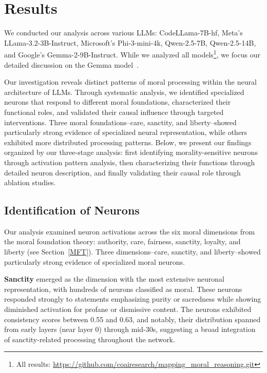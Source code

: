 \documentclass[runninghheads]{llncs}
\begin{document}
\section{Results}
\label{results}


We conducted our analysis across various LLMs: CodeLLama-7B-hf, Meta's LLama-3.2-3B-Instruct, Microsoft's Phi-3-mini-4k, Qwen-2.5-7B, Qwen-2.5-14B, and Google's Gemma-2-9B-Instruct. While we analyzed all models\footnote{All results: \href{https://github.com/coairesearch/mapping_moral_reasoning.git}{https://github.com/coairesearch/mapping\_moral\_reasoning.git}}, we focus our detailed discussion on the Gemma model~\cite{Gemma2024}.


Our investigation reveals distinct patterns of moral processing within the neural architecture of LLMs. Through systematic analysis, we identified specialized neurons that respond to different moral foundations, characterized their functional roles, and validated their causal influence through targeted interventions. Three moral foundations--care, sanctity, and liberty--showed particularly strong evidence of specialized neural representation, while others exhibited more distributed processing patterns. Below, we present our findings organized by our three-stage analysis: first identifying morality-sensitive neurons through activation pattern analysis, then characterizing their functions through detailed neuron description, and finally validating their causal role through ablation studies.


\subsection{Identification of Neurons}

Our analysis examined neuron activations across the six moral dimensions from the moral foundation theory: authority, care, fairness, sanctity, loyalty, and liberty (see Section~\ref{MFT}). Three dimensions--care, sanctity, and liberty--showed particularly strong evidence of specialized moral neurons.

\textbf{Sanctity} emerged as the dimension with the most extensive neuronal representation, with hundreds of neurons classified as moral. These neurons responded strongly to statements emphasizing purity or sacredness while showing diminished activation for profane or dismissive content. The neurons exhibited consistency scores between 0.55 and 0.63, and notably, their distribution spanned from early layers (near layer 0) through mid-30s, suggesting a broad integration of sanctity-related processing throughout the network.
\end{document}
